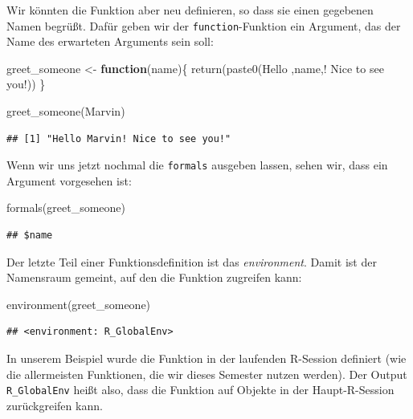 \documentclass[
]{book}
\newenvironment{Shaded}{\begin{snugshade}}{\end{snugshade}}
\newcommand{\ControlFlowTok}[1]{\textcolor[rgb]{0.13,0.29,0.53}{\textbf{#1}}}
\newcommand{\FunctionTok}[1]{\textcolor[rgb]{0.00,0.00,0.00}{#1}}
\newcommand{\NormalTok}[1]{#1}
\newcommand{\OtherTok}[1]{\textcolor[rgb]{0.56,0.35,0.01}{#1}}
\newcommand{\StringTok}[1]{\textcolor[rgb]{0.31,0.60,0.02}{#1}}
\begin{document}
Wir könnten die Funktion aber neu definieren, so dass sie einen gegebenen Namen begrüßt. Dafür geben wir der \texttt{function}-Funktion ein Argument, das der Name des erwarteten Arguments sein soll:

\begin{Shaded}
\begin{Highlighting}[]
\NormalTok{greet\_someone }\OtherTok{\textless{}{-}} \ControlFlowTok{function}\NormalTok{(name)\{}
  \FunctionTok{return}\NormalTok{(}\FunctionTok{paste0}\NormalTok{(}\StringTok{\textquotesingle{}Hello \textquotesingle{}}\NormalTok{,name,}\StringTok{\textquotesingle{}! Nice to see you!\textquotesingle{}}\NormalTok{))}
\NormalTok{\}}

\FunctionTok{greet\_someone}\NormalTok{(}\StringTok{\textquotesingle{}Marvin\textquotesingle{}}\NormalTok{)}
\end{Highlighting}
\end{Shaded}

\begin{verbatim}
## [1] "Hello Marvin! Nice to see you!"
\end{verbatim}

Wenn wir uns jetzt nochmal die \texttt{formals} ausgeben lassen, sehen wir, dass ein Argument vorgesehen ist:

\begin{Shaded}
\begin{Highlighting}[]
\FunctionTok{formals}\NormalTok{(greet\_someone)}
\end{Highlighting}
\end{Shaded}

\begin{verbatim}
## $name
\end{verbatim}

Der letzte Teil einer Funktionsdefinition ist das \emph{environment}. Damit ist der Namensraum gemeint, auf den die Funktion zugreifen kann:

\begin{Shaded}
\begin{Highlighting}[]
\FunctionTok{environment}\NormalTok{(greet\_someone)}
\end{Highlighting}
\end{Shaded}

\begin{verbatim}
## <environment: R_GlobalEnv>
\end{verbatim}

In unserem Beispiel wurde die Funktion in der laufenden R-Session definiert (wie die allermeisten Funktionen, die wir dieses Semester nutzen werden). Der Output \texttt{R\_GlobalEnv} heißt also, dass die Funktion auf Objekte in der Haupt-R-Session zurückgreifen kann.
\end{document}
